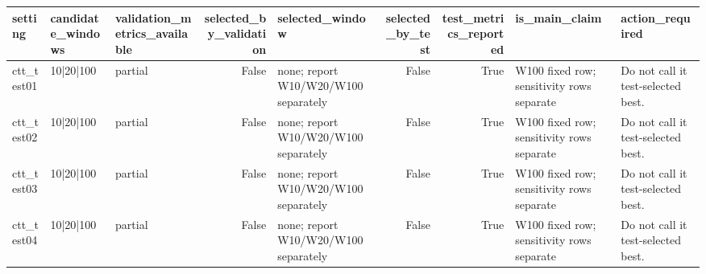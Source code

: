\begin{tabular}{lllrlrrll}
\toprule
setting & candidate\_windows & validation\_metrics\_available & selected\_by\_validation & selected\_window & selected\_by\_test & test\_metrics\_reported & is\_main\_claim & action\_required \\
\midrule
ctt\_test01 & 10|20|100 & partial & False & none; report W10/W20/W100 separately & False & True & W100 fixed row; sensitivity rows separate & Do not call it test-selected best. \\
ctt\_test02 & 10|20|100 & partial & False & none; report W10/W20/W100 separately & False & True & W100 fixed row; sensitivity rows separate & Do not call it test-selected best. \\
ctt\_test03 & 10|20|100 & partial & False & none; report W10/W20/W100 separately & False & True & W100 fixed row; sensitivity rows separate & Do not call it test-selected best. \\
ctt\_test04 & 10|20|100 & partial & False & none; report W10/W20/W100 separately & False & True & W100 fixed row; sensitivity rows separate & Do not call it test-selected best. \\
\bottomrule
\end{tabular}
